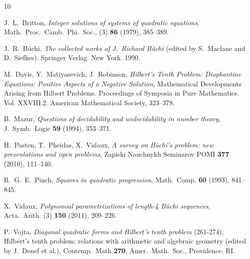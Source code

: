 \documentclass[letterpaper,10pt]{amsart}
\theoremstyle{definition}
\numberwithin{equation}{section}
\begin{document}
	\begin{thebibliography}{10}
	
		J.~L.~Britton, \emph{Integer solutions of systems of quadratic equations}, Math.~Proc.~Camb.~Phi.~Soc., (3) \textbf{86} (1979), 385--389. 
		
		J.~R.~B\"{u}chi, \emph{The collected works of J.~Richard B\"{u}chi} (edited by S.~Maclane and D.~Siefkes). Springer Verlag. New York. 1990. 
		
		M.~Davis, Y.~Matiyasevich, J.~Robinson, \emph{Hilbert's Tenth Problem: Diophantine Equations: Positive Aspects of a Negative Solution},  Mathematical Developments Arising from Hilbert Problems. Proceedings of Symposia in Pure Mathematics. Vol. XXVIII.2. American Mathematical Society, 323--378.
		
		B.~Mazur, \emph{Questions of decidability and undecidability in number theory}, J.~Symb.~Logic \textbf{59} (1994), 353--371. 
		
		H.~Pasten, T.~Pheidas, X.~Vidaux, \emph{A survey on B\"{u}chi's problem: new presentations and open problems}, Zapiski Nauchnykh Seminarov POMI \textbf{377} (2010), 111--140.
		
		R.~G.~E.~Pinch, \emph{Squares in quadratic progression}, Math.~Comp. \textbf{60} (1993), 841--845.		
		
		
		X.~Vidaux, \emph{Polynomial parametrizations of length-4 B\"{u}chi sequences}, Acta.~Arith.  (3) \textbf{150} (2011), 209--226. 
		
		P.~Vojta, \emph{Diagonal quadratic forms and Hilbert’s tenth problem} (261-274), Hilbert's tenth problem: relations with arithmetic and algebraic geometry (edited by J.~Denef et al.), Contemp.~Math \textbf{270}, Amer.~Math.~Soc., Providence, RI. 
		
		
		
		
		
		
	\end{thebibliography}
	
\end{document}
